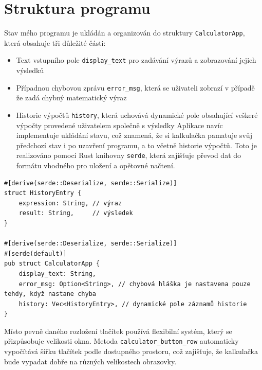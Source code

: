 \documentclass[12pt]{report}
\begin{document}
\section{Struktura programu}

Stav mého programu je ukládán a organizován do struktury
\texttt{CalculatorApp}, která obsahuje tři důležité části: 
\begin{itemize}
    \item Text
vstupního pole \texttt{display\_text} pro zadávání výrazů a zobrazování
jejich výsledků 
    \item Případnou chybovou zprávu \texttt{error\_msg}, která
se uživateli zobrazí v případě že zadá chybný matematický výraz 
    \item Historie výpočtů \texttt{history}, která uchovává dynamické pole
obsahující veškeré výpočty provedené uživatelem společně s výsledky
Aplikace navíc implementuje ukládání stavu, což znamená, že si
kalkulačka pamatuje svůj předchozí stav i po uzavření programu, a to
včetně historie výpočtů. Toto je realizováno pomocí Rust knihovny
\texttt{serde}, která zajišťuje převod dat do formátu vhodného pro
uložení a opětovné načtení.
\end{itemize}

\begin{samepage}
\begin{verbatim}
#[derive(serde::Deserialize, serde::Serialize)]
struct HistoryEntry {
    expression: String, // výraz
    result: String,     // výsledek
}

#[derive(serde::Deserialize, serde::Serialize)]
#[serde(default)]
pub struct CalculatorApp {
    display_text: String,
    error_msg: Option<String>, // chybová hláška je nastavena pouze tehdy, když nastane chyba
    history: Vec<HistoryEntry>, // dynamické pole záznamů historie
}
\end{verbatim}
\end{samepage}

Místo pevně daného rozložení tlačítek používá flexibilní systém, který
se přizpůsobuje velikosti okna. Metoda \texttt{calculator\_button\_row}
automaticky vypočítává šířku tlačítek podle dostupného prostoru, což
zajišťuje, že kalkulačka bude vypadat dobře na různých velikostech
obrazovky.
\end{document}
